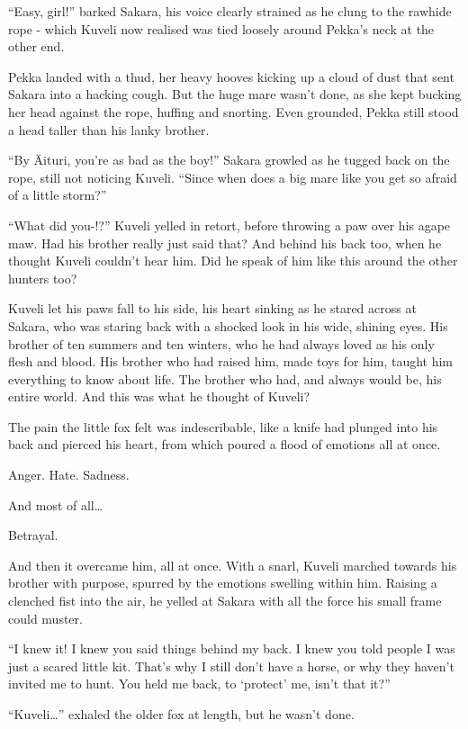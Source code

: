 ``Easy, girl!'' barked Sakara, his voice clearly strained as he clung to the rawhide rope - which Kuveli now realised was tied loosely around Pekka's neck at the other end.

Pekka landed with a thud, her heavy hooves kicking up a cloud of dust that sent Sakara into a hacking cough. But the huge mare wasn't done, as she kept bucking her head against the rope, huffing and snorting. Even grounded, Pekka still stood a head taller than his lanky brother.

``By Äituri, you're as bad as the boy!'' Sakara growled as he tugged back on the rope, still not noticing Kuveli. ``Since when does a big mare like you get so afraid of a little storm?''

``What did you-!?'' Kuveli yelled in retort, before throwing a paw over his agape maw. Had his brother really just said that? And behind his back too, when he thought Kuveli couldn't hear him. Did he speak of him like this around the other hunters too?

Kuveli let his paws fall to his side, his heart sinking as he stared across at Sakara, who was staring back with a shocked look in his wide, shining eyes. His brother of ten summers and ten winters, who he had always loved as his only flesh and blood. His brother who had raised him, made toys for him, taught him everything to know about life. The brother who had, and always would be, his entire world. And this was what he thought of Kuveli?

The pain the little fox felt was indescribable, like a knife had plunged into his back and pierced his heart, from which poured a flood of emotions all at once.

Anger. Hate. Sadness.

And most of all\ldots{}

Betrayal.

And then it overcame him, all at once. With a snarl, Kuveli marched towards his brother with purpose, spurred by the emotions swelling within him. Raising a clenched fist into the air, he yelled at Sakara with all the force his small frame could muster.

``I knew it! I knew you said things behind my back. I knew you told people I was just a scared little kit. That's why I still don't have a horse, or why they haven't invited me to hunt. You held me back, to `protect' me, isn't that it?''

``Kuveli\ldots'' exhaled the older fox at length, but he wasn't done.

